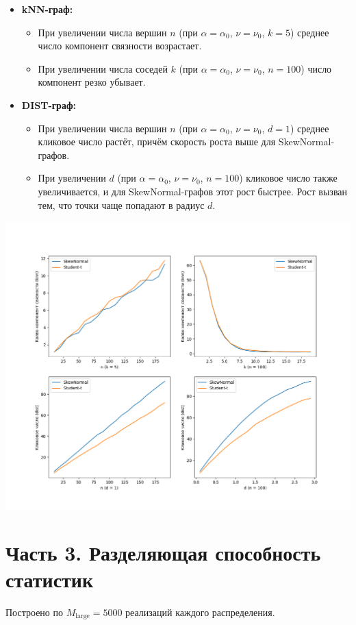 \documentclass[12pt,a4paper]{article}
\begin{document}
\begin{itemize}
  \item \textbf{kNN-граф:}
    \begin{itemize}
      \item При увеличении числа вершин $n$ (при $\alpha=\alpha_0$, $\nu=\nu_0$, $k=5$) среднее число компонент связности возрастает.
      \item При увеличении числа соседей $k$ (при $\alpha=\alpha_0$, $\nu=\nu_0$, $n=100$) число компонент резко убывает.
    \end{itemize}

  \item \textbf{DIST-граф:}
    \begin{itemize}
      \item При увеличении числа вершин $n$ (при $\alpha=\alpha_0$, $\nu=\nu_0$, $d=1$) среднее кликовое число растёт, причём скорость роста выше для SkewNormal-графов.
      \item При увеличении $d$ (при $\alpha=\alpha_0$, $\nu=\nu_0$, $n=100$) кликовое число также увеличивается, и для SkewNormal-графов этот рост быстрее. Рост вызван тем, что точки чаще попадают в радиус $d$.
    \end{itemize}
\end{itemize}

\begin{center}
  \includegraphics[width=0.9\linewidth]{part2_results_Askar.png}
\end{center}

\section*{Часть 3. Разделяющая способность статистик}
\vspace{-1em}
\noindent
Построено по $M_{\text{large}}=5000$ реализаций каждого распределения.
\end{document}
